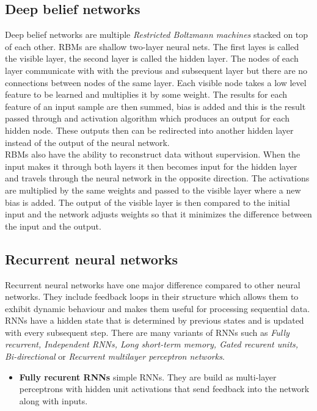 \subsection{Deep belief networks}
Deep belief networks are multiple \textit{Restricted Boltzmann machines} stacked on top of each other.  RBMs are shallow two-layer neural nets. The first layes is called the visible layer, the second layer is called the hidden layer. The nodes of each layer communicate with with the previous and subsequent layer but there are no connections between nodes of the same layer. Each visible node takes a low level feature to be learned and multiplies it by some weight. The results for each feature of an input sample are then summed, bias is added and this is the result passed through and activation algorithm which produces an output for each hidden node. These outputs then can be redirected into another hidden layer instead of the output of the neural network. \\
RBMs also have the ability to reconstruct data without supervision. When the input makes it through both layers it then becomes input for the hidden layer and travels through the neural network in the opposite direction. The activations are multiplied by the same weights and passed to the visible layer where a new bias is added. The output of the visible layer is then compared to the initial input and the network adjusts weights so that it minimizes the difference between the input and the output.

\subsection{Recurrent neural networks}
Recurrent neural networks have one major difference compared to other neural networks. They include feedback loops in their structure which allows them to exhibit dynamic behaviour and makes them useful for processing sequential data. RNNs have a hidden state that is determined by previous states and is updated with every subsequent step. There are many variants of RNNs such as \textit{Fully recurrent, Independent RNNs, Long short-term memory, Gated recurent units, Bi-directional} or \textit{Recurrent multilayer perceptron networks}. 

\begin{itemize}
    \item \textbf{Fully recurent RNNs} simple RNNs. They are build as multi-layer perceptrons with hidden unit activations that send feedback into the network along with inputs.
\end{itemize}

